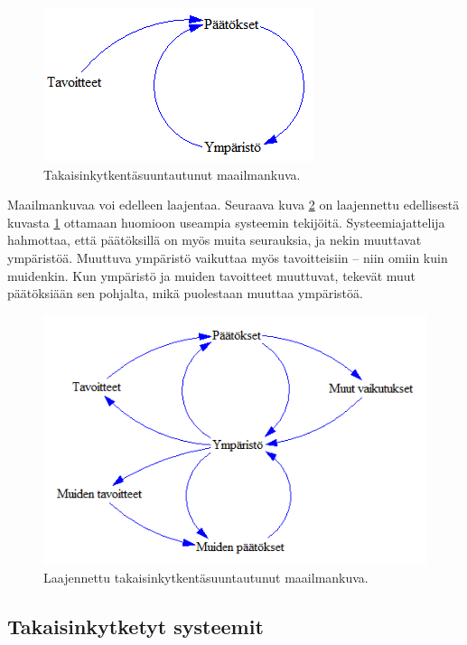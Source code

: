 \documentclass[finnish,12pt,a4paper,pdftex]{article}
\begin{document}
\begin{onehalfspacing}
\begin{figure}[H]
\centering \includegraphics{takaisinkytkentasuuntautunut}
\caption{Takaisinkytkentäsuuntautunut maailmankuva. \cite[s. 11]{Sterman2000} \label{takaisinkytkentasuuntautunut}}
\end{figure}

Maailmankuvaa voi edelleen laajentaa. Seuraava kuva \ref{laajennettutakaisinkytkentasuuntautunut} on laajennettu edellisestä kuvasta \ref{takaisinkytkentasuuntautunut} ottamaan huomioon useampia systeemin tekijöitä. Systeemiajattelija hahmottaa, että päätöksillä on myös muita seurauksia, ja nekin muuttavat ympäristöä. Muuttuva ympäristö vaikuttaa myös tavoitteisiin -- niin omiin kuin muidenkin. Kun ympäristö ja muiden tavoitteet muuttuvat, tekevät muut päätöksiään sen pohjalta, mikä puolestaan muuttaa ympäristöä. \cite[s. 11--12]{Sterman2000}

\begin{figure}[H]
\centering \includegraphics{laajennettutakaisinkytkentasuuntautunut}
\caption{Laajennettu takaisinkytkentäsuuntautunut maailmankuva. \cite[s. 11]{Sterman2000} \label{laajennettutakaisinkytkentasuuntautunut}}
\end{figure}


\subsection{Takaisinkytketyt systeemit \label{sysdyn:takaisinkytkenta}}


\end{onehalfspacing}
\end{document}
